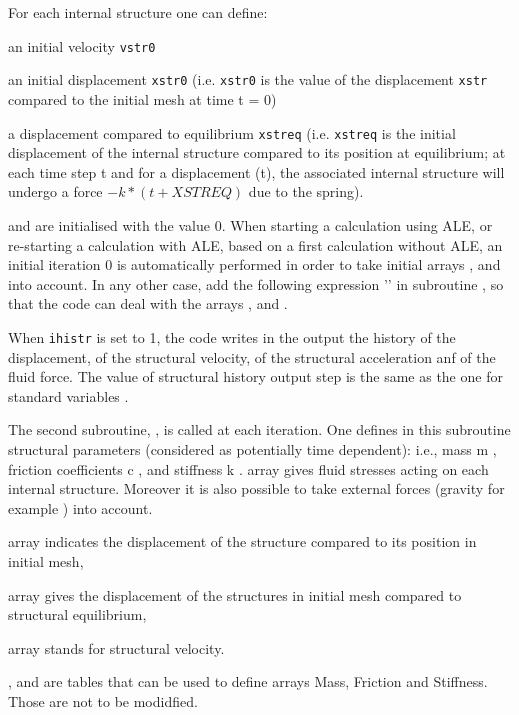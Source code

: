 {For each internal structure one can define:
\begin{list}{-}{}
 \item an initial velocity \texttt{vstr0}
 \item an initial displacement \texttt{xstr0} (i.e. \texttt{xstr0} is the value of the
 displacement \texttt{xstr} compared to the initial mesh at time t = 0)
 \item a displacement compared to equilibrium  \texttt{xstreq} (i.e. \texttt{xstreq}
 is the initial displacement of the internal structure compared to its position at
 equilibrium; at each time step t and for a displacement (t), the associated
 internal structure will undergo a force $-k*(\text{}t+XSTREQ)$ due to the spring).
\end{list}
 and  are initialised with the value 0.
When starting a calculation using ALE, or re-starting a calculation with ALE, based
 on a first calculation without ALE, an initial iteration 0 is automatically performed
 in order to take initial arrays ,  and  into
 account. In any other case, add the following expression '' in subroutine
 , so that the code can deal with the arrays ,  and .

When \texttt{ihistr} is set to 1, the code writes in the output the history of the
 displacement, of the structural velocity, of the structural acceleration anf of the
 fluid force. The value of structural history output step is the same as the one for
 standard variables .

The second subroutine, , is called at each iteration. One defines in this
 subroutine structural parameters (considered as potentially time dependent): i.e.,
 mass m , friction coefficients c , and stiffness k .
  array gives fluid stresses acting on each internal structure. Moreover it is also
 possible to take external forces (gravity for example ) into account.
\begin{list}{.}{}
 \item {} array indicates the displacement of the structure compared to its position in initial mesh,
 \item {} array gives the displacement of the structures in initial mesh
 compared to structural equilibrium,
 \item {} array stands for structural velocity.
\end{list}
,  and  are  tables that can be used to
 define arrays Mass, Friction and Stiffness. Those are not to be modidfied.

}
